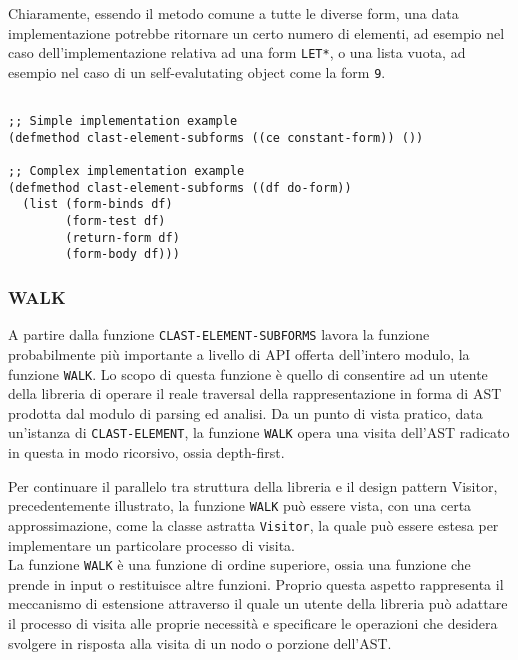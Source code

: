 Chiaramente, essendo il metodo comune a tutte le diverse form, una data
implementazione potrebbe ritornare un certo numero di elementi, ad esempio nel
caso dell'implementazione relativa ad una form \texttt{LET*}, o una lista vuota,
ad esempio nel caso di un self-evalutating object come la form \texttt{9}.

\begin{lstlisting}[caption=Esempi di implementazione del metodo
\texttt{CLAST-ELEMENT-SUBFORMS}]

;; Simple implementation example
(defmethod clast-element-subforms ((ce constant-form)) ())

;; Complex implementation example
(defmethod clast-element-subforms ((df do-form))
  (list (form-binds df)
        (form-test df)
        (return-form df)
        (form-body df)))

\end{lstlisting}

\subsubsection{WALK}

A partire dalla funzione \texttt{CLAST-ELEMENT-SUBFORMS} lavora la funzione
probabilmente più importante a livello di API offerta dell'intero modulo, la
funzione \texttt{WALK}. Lo scopo di questa funzione è quello di consentire ad un
utente della libreria di operare il reale traversal della rappresentazione in
forma di AST prodotta dal modulo di parsing ed analisi. Da un punto di vista
pratico, data un'istanza di \texttt{CLAST-ELEMENT}, la funzione \texttt{WALK}
opera una visita dell'AST radicato in questa in modo ricorsivo, ossia
depth-first.

Per continuare il parallelo tra struttura della libreria e il design pattern
Visitor, precedentemente illustrato, la funzione \texttt{WALK} può essere vista,
con una certa approssimazione, come la classe astratta \texttt{Visitor}, la
quale può essere estesa per implementare un particolare processo di visita.\\

La funzione \texttt{WALK} è una funzione di ordine superiore, ossia una funzione
che prende in input o restituisce altre funzioni. Proprio questa aspetto
rappresenta il meccanismo di estensione attraverso il quale un utente della
libreria può adattare il processo di visita alle proprie necessità e specificare
le operazioni che desidera svolgere in risposta alla visita di un nodo o
porzione dell'AST.

